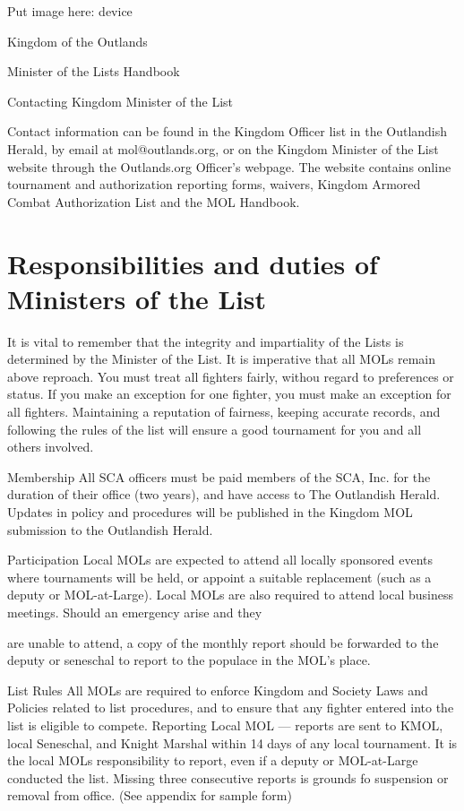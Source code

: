\documentclass{article}
\begin{document}
Put image here: device


\begin{center}
{\Huge
Kingdom of the Outlands

Minister of the Lists
Handbook

}\end{center}

\tableofcontents Contacting Kingdom Minister of the List

Contact information can be found in the Kingdom Officer list in the Outlandish Herald, by email at
mol@outlands.org, or on the Kingdom Minister of the List website through the Outlands.org
Officer’s webpage. The website contains online tournament and authorization reporting forms,
waivers, Kingdom Armored Combat Authorization List and the MOL Handbook.


\section{Responsibilities and duties of Ministers of the List}

It is vital to remember that the integrity and impartiality of the Lists is determined by the Minister of the
List. It is imperative that all MOLs remain above reproach.
You must treat all fighters fairly, withou regard to preferences or status.
If you make an exception for one fighter, you must make an exception
for all fighters. Maintaining a reputation of fairness, keeping accurate records, and following the rules
of the list will ensure a good tournament for you and all others involved.


Membership All SCA officers must be paid members of the SCA, Inc. for the duration of their office
(two years), and have access to The Outlandish Herald. Updates in policy and procedures
will be published in the Kingdom MOL submission to the Outlandish Herald.


Participation Local MOLs are expected to attend all locally sponsored events where tournaments will be
held, or appoint a suitable replacement (such as a deputy or MOL-at-Large). Local MOLs
are also required to attend local business meetings. Should an emergency arise and they

are unable to attend, a copy of the monthly report should be forwarded to the deputy or
seneschal to report to the populace in the MOL’s place.

List Rules All MOLs are required to enforce Kingdom and Society Laws and Policies related
to list procedures, and to ensure that any fighter entered into the list is eligible to compete.
Reporting Local MOL --- reports are sent to KMOL, local Seneschal, and Knight Marshal within 14
days of any local tournament. It is the local MOLs responsibility to report, even if a deputy
or MOL-at-Large conducted the list. Missing three consecutive reports is grounds fo
suspension or removal from office. (See appendix for sample form)
\end{document}
